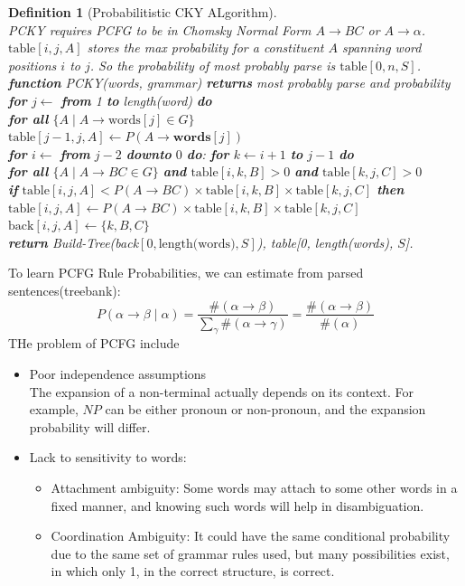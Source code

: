 \documentclass[12pt]{article}
\newcommand{\ind}{\hspace*{15pt}}
\newtheorem{definition}{Definition}[section]
\theoremstyle{definition}
\begin{document}
\begin{definition}[Probabilitistic CKY ALgorithm]
\hfill\\\normalfont PCKY requires PCFG to be in Chomsky Normal Form $A\to BC$ or $A\to \alpha$.\\
$\text{table}[i,j,A]$ stores the max probability for a constituent $A$ spanning word positions $i$ to $j$. So the probability of most probably parse is $\text{table}[0,n,S]$.\\


\textbf{function} PCKY(words, grammar) \textbf{returns} most probably parse and probability\\
\textbf{for} $j\leftarrow$ \textbf{from} 1 \textbf{to} length(word) \textbf{do}\\
\ind \textbf{for all} $\{A\mid A\to \text{words}[j] \in G\}$\\
\ind \ind $\text{table}[j-1,j,A]\leftarrow P(A\to \textbf{words}[j])$\\
\ind \textbf{for} $i\leftarrow$ \textbf{from} $j-2$ \textbf{downto} $0$ \textbf{do}:
\ind \ind \textbf{for} $k\leftarrow i + 1$ \textbf{to} $j-1$ \textbf{do}\\
\ind \ind \ind \textbf{for all} $\{A\mid A\to BC \in G\}$ \textbf{and} $\text{table}[i,k,B]>0$ \textbf{and} $\text{table}[k,j,C]>0$\\
\ind \ind \ind \ind \textbf{if} $\text{table}[i,j,A] < P(A\to BC)\times \text{table}[i,k,B]\times \text{table}[k, j, C]$ \textbf{then}\\
\ind \ind \ind \ind \ind $\text{table}[i,j,A]\leftarrow P(A\to BC)\times \text{table}[i,k,B]\times \text{table}[k, j, C]$\\
\ind \ind \ind \ind \ind $\text{back}[i,j,A]\leftarrow \{k, B, C\}$\\
\textbf{return} Build-Tree(back$[0, \text{length(words)}, S]$), table[0, length(words), $S$].
\end{definition}
To learn PCFG Rule Probabilities, we can estimate from parsed sentences(treebank):
\[
P(\alpha\to \beta\mid \alpha) = \frac{\#(\alpha\to\beta)}{\sum_{\gamma}\#(\alpha\to\gamma)} = \frac{\#(\alpha\to\beta)}{\#(\alpha)}
\]
THe problem of PCFG include
\begin{itemize}
	\item Poor independence assumptions\\
	The expansion of a non-terminal actually depends on its context. For example, $NP$ can be either pronoun or non-pronoun, and the expansion probability will differ. 
	\item Lack to sensitivity to words:
	\begin{itemize}
		\item Attachment ambiguity: Some words may attach to some other words in a fixed manner, and knowing such words will help in disambiguation.
		\item Coordination Ambiguity: It could have the same conditional probability due to the same set of grammar rules used, but many possibilities exist, in which only 1, in the correct structure, is correct.
	\end{itemize}
\end{itemize}
\end{document}
